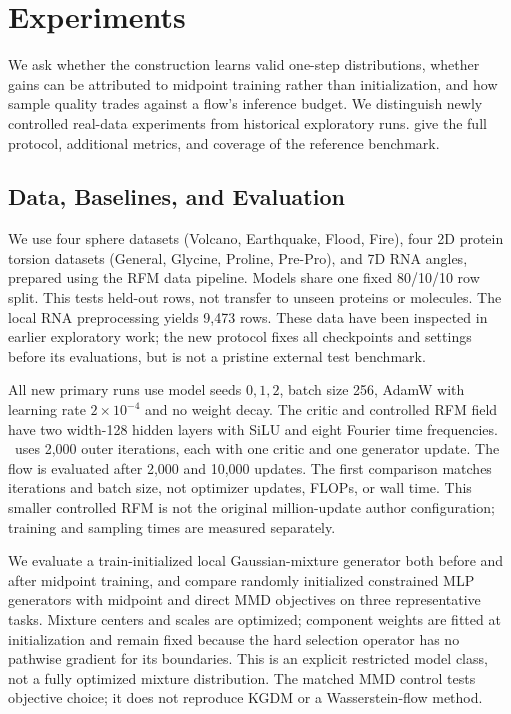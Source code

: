 \section{Experiments}
\label{sec:experiments}
We ask whether the construction learns valid one-step distributions, whether gains can be attributed to midpoint training rather than initialization, and how sample quality trades against a flow's inference budget. We distinguish newly controlled real-data experiments from historical exploratory runs.  give the full protocol, additional metrics, and coverage of the reference benchmark.

\subsection{Data, Baselines, and Evaluation}
We use four sphere datasets (Volcano, Earthquake, Flood, Fire), four 2D protein torsion datasets (General, Glycine, Proline, Pre-Pro), and 7D RNA angles, prepared using the RFM data pipeline. Models share one fixed 80/10/10 row split. This tests held-out rows, not transfer to unseen proteins or molecules. The local RNA preprocessing yields 9,473 rows. These data have been inspected in earlier exploratory work; the new protocol fixes all checkpoints and settings before its evaluations, but is not a pristine external test benchmark.

All new primary runs use model seeds $0,1,2$, batch size 256, AdamW with learning rate $2\times10^{-4}$ and no weight decay. The critic and controlled RFM field have two width-128 hidden layers with SiLU and eight Fourier time frequencies. \RMGM\ uses 2,000 outer iterations, each with one critic and one generator update. The flow is evaluated after 2,000 and 10,000 updates. The first comparison matches iterations and batch size, not optimizer updates, FLOPs, or wall time. This smaller controlled RFM is not the original million-update author configuration; training and sampling times are measured separately.

We evaluate a train-initialized local Gaussian-mixture generator both before and after midpoint training, and compare randomly initialized constrained MLP generators with midpoint and direct MMD objectives on three representative tasks. Mixture centers and scales are optimized; component weights are fitted at initialization and remain fixed because the hard selection operator has no pathwise gradient for its boundaries. This is an explicit restricted model class, not a fully optimized mixture distribution. The matched MMD control tests objective choice; it does not reproduce KGDM or a Wasserstein-flow method.

